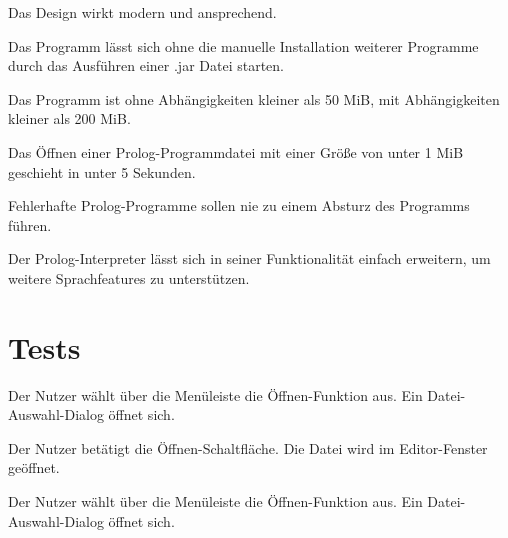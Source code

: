 \documentclass[parskip=full,11pt,twoside]{scrartcl}
\begin{document}

Das Design wirkt modern und ansprechend.


Das Programm lässt sich ohne die manuelle Installation weiterer Programme durch das Ausführen einer .jar Datei starten.


Das Programm ist ohne Abhängigkeiten kleiner als 50 MiB, mit Abhängigkeiten kleiner als 200 MiB.


Das Öffnen einer Prolog-Programmdatei mit einer Größe von unter 1 MiB geschieht in unter 5 Sekunden.


Fehlerhafte Prolog-Programme sollen nie zu einem Absturz des Programms führen.


Der Prolog-Interpreter lässt sich in seiner Funktionalität einfach erweitern, um weitere Sprachfeatures zu unterstützen.

\section{Tests}


{Der Nutzer wählt über die Menüleiste die Öffnen-Funktion aus.}
{Ein Datei-Auswahl-Dialog öffnet sich.}

{Der Nutzer betätigt die Öffnen-Schaltfläche.}
{Die Datei wird im Editor-Fenster geöffnet.}


{Der Nutzer wählt über die Menüleiste die Öffnen-Funktion aus.}
{Ein Datei-Auswahl-Dialog öffnet sich.}
\end{document}
